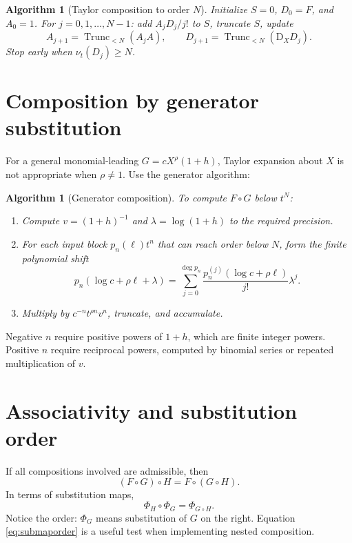 \documentclass[11pt,oneside,openany]{book}
\newtheorem{algorithm}[theorem]{Algorithm}
\newcommand{\ordt}{\nu_t}
\newcommand{\TransseriesTruncateBelow}[2]{%
  \operatorname{Trunc}_{<#2}\!\left(#1\right)%
}
\newcommand{\compose}{\mathbin{\circ}}
\newcommand{\D}{\mathrm{D}}
\begin{document}
\begin{algorithm}[Taylor composition to order \(N\)]\label{alg:taylorcompose}
Initialize \(S=0\), \(D_0=F\), and \(A_0=1\).  For
\(j=0,1,\ldots,N-1\): add \(A_jD_j/j!\) to \(S\), truncate \(S\), update
\[
 A_{j+1}=\TransseriesTruncateBelow{A_jA}{N},
 \qquad
 D_{j+1}=\TransseriesTruncateBelow{\D_XD_j}{N}.
\]
Stop early when \(\ordt(D_j)\geq N\).
\end{algorithm}

\section{Composition by generator substitution}
For a general monomial-leading \(G=cX^\rho(1+h)\), Taylor expansion about
\(X\) is not appropriate when \(\rho\neq1\).  Use the generator algorithm:

\begin{algorithm}[Generator composition]\label{alg:generatorcompose}
To compute \(F\compose G\) below \(t^N\):
\begin{enumerate}
\item Compute \(v=(1+h)^{-1}\) and \(\lambda=\log(1+h)\) to the required
precision.
\item For each input block \(p_n(\ell)t^n\) that can reach order below \(N\),
form the finite polynomial shift
\[
 p_n(\log c+\rho\ell+\lambda)
 =\sum_{j=0}^{\deg p_n}
   \frac{p_n^{(j)}(\log c+\rho\ell)}{j!}\lambda^j.
\]
\item Multiply by \(c^{-n}t^{\rho n}v^n\), truncate, and accumulate.
\end{enumerate}
\end{algorithm}

Negative \(n\) require positive powers of \(1+h\), which are finite integer
powers.  Positive \(n\) require reciprocal powers, computed by binomial series
or repeated multiplication of \(v\).

\section{Associativity and substitution order}
If all compositions involved are admissible, then
\begin{equation}\label{eq:associativecomposition}
 (F\compose G)\compose H=F\compose(G\compose H).
\end{equation}
In terms of substitution maps,
\begin{equation}\label{eq:submaporder}
 \Phi_H\circ\Phi_G=\Phi_{G\compose H}.
\end{equation}
Notice the order: \(\Phi_G\) means substitution of \(G\) on the right.
Equation \cref{eq:submaporder} is a useful test when implementing nested
composition.
\end{document}
